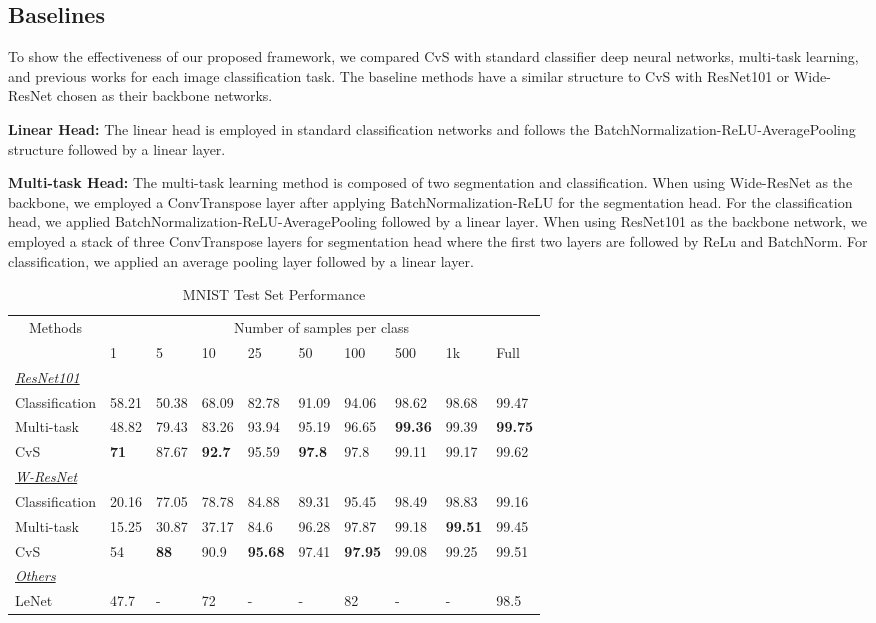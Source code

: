 \documentclass[conference]{IEEEtran}
\begin{document}
\subsection{Baselines}
To show the effectiveness of our proposed framework, we compared CvS with standard classifier deep neural networks, multi-task learning, and previous works for each image classification task. The baseline methods have a similar structure to CvS with ResNet101 or Wide-ResNet chosen as their backbone networks. 

\textbf{Linear Head:}
The linear head is employed in standard classification networks and follows the 
BatchNormalization-ReLU-AveragePooling structure followed by a linear layer.

\textbf{Multi-task Head:}
The multi-task learning method is composed of two segmentation and classification. When using Wide-ResNet as the backbone, we employed a ConvTranspose layer after applying BatchNormalization-ReLU for the segmentation head. For the classification head, we applied BatchNormalization-ReLU-AveragePooling followed by a linear layer. When using ResNet101 as the backbone network, we employed a stack of three ConvTranspose layers for segmentation head where the first two layers are followed by ReLu and BatchNorm. For classification, we applied an average pooling layer followed by a linear layer.
%
\begin{table*}[]
\small
\centering
\caption{MNIST Test Set Performance}%
\label{tab:mnist-res}
\begin{tabular}{llllllllll}
\hline
\multicolumn{1}{c}{\multirow{2}{*}{Methods}} & \multicolumn{9}{c}{Number of samples per class} \\ \cline{2-10} 
\multicolumn{1}{c}{} & 1 & 5 & 10 & 25 & 50 & 100 & 500 & 1k & Full \\ \hline
{\ul \textit{ResNet101}} &  &  &  &  &  &  &  &  &  \\
Classification & 58.21 & 50.38 & 68.09 & 82.78 & 91.09 & 94.06 & 98.62 & 98.68 & 99.47 \\
Multi-task & 48.82 & 79.43 & 83.26 & 93.94 & 95.19 & 96.65 & \textbf{99.36} & 99.39 & \textbf{99.75} \\
CvS & \textbf{71} & 87.67 & \textbf{92.7} & 95.59 & \textbf{97.8} & 97.8 & 99.11 & 99.17 & 99.62 \\ \hline
{\ul \textit{W-ResNet}} &  &  &  &  &  &  &  &  &  \\
Classification & 20.16 & 77.05 & 78.78 & 84.88 & 89.31 & 95.45 & 98.49 & 98.83 & 99.16 \\
Multi-task & 15.25 & 30.87 & 37.17 & 84.6 & 96.28 & 97.87 & 99.18 & \textbf{99.51} & 99.45 \\
CvS & 54 & \textbf{88} & 90.9 & \textbf{95.68} & 97.41 & \textbf{97.95} & 99.08 & 99.25 & 99.51 \\ \hline
{\ul \textit{Others}} &  &  &  &  &  &  &  &  &  \\
LeNet & 47.7 & - & 72 & - & - & 82 & - & - & 98.5 \\ \hline
\end{tabular}
\end{table*}
%
\end{document}
